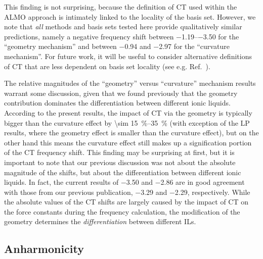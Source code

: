 \documentclass[%
  class = book,%
  crop = false,%
  float = true,%
  multi = true,%
  preview = false,%
]{standalone}
\begin{document}
This finding is not surprising, because the definition of CT used within the ALMO approach is intimately linked to the locality of the basis set. However, we note that \emph{all} methods and basis sets tested here provide qualitatively similar predictions, namely a negative frequency shift between \SIrange{-1.19}{-3.50}{\wavenumber} for the ``geometry mechanism'' and between \num{-0.94} and \SI{-2.97}{\wavenumber} for the ``curvature mechanism''. For future work, it will be useful to consider alternative definitions of CT that are less dependent on basis set locality (see e.g. Ref.~\parencite{Lao2016a}).

The relative magnitudes of the ``geometry'' versus ``curvature'' mechanism results warrant some discussion, given that we found previously that the geometry contribution dominates the differentiation between different ionic liquids. According to the present results, the impact of CT via the geometry is typically bigger than the curvature effect by \SIrange{\sim 15}{35}{\percent} (with exception of the LP results, where the geometry effect is smaller than the curvature effect), but on the other hand this means the curvature effect still makes up a signification portion of the CT frequency shift. This finding may be surprising at first, but it is important to note that our previous discussion was not about the absolute magnitude of the shifts, but about the differentiation between different ionic liquids. In fact, the current results of \num{-3.50} and \SI{-2.86}{\wavenumber} are in good agreement with those from our previous publication, \SI{-3.29}{\wavenumber} and \SI{-2.29}{\wavenumber}, respectively. While the absolute values of the CT shifts are largely caused by the impact of CT on the force constants during the frequency calculation, the modification of the geometry determines the \emph{differentiation} between different ILs.

\subsection{Anharmonicity}
\label{paper_02:ssec:IIIB}
\end{document}
